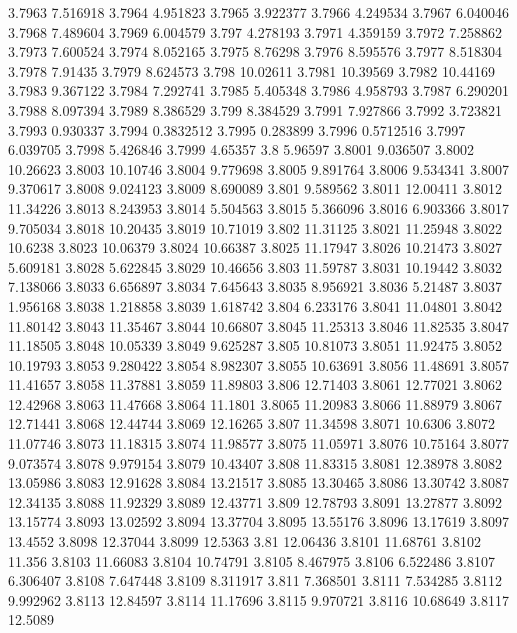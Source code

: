 3.7963  7.516918
3.7964  4.951823
3.7965  3.922377
3.7966  4.249534
3.7967  6.040046
3.7968  7.489604
3.7969  6.004579
3.797  4.278193
3.7971  4.359159
3.7972  7.258862
3.7973  7.600524
3.7974  8.052165
3.7975  8.76298
3.7976  8.595576
3.7977  8.518304
3.7978  7.91435
3.7979  8.624573
3.798  10.02611
3.7981  10.39569
3.7982  10.44169
3.7983  9.367122
3.7984  7.292741
3.7985  5.405348
3.7986  4.958793
3.7987  6.290201
3.7988  8.097394
3.7989  8.386529
3.799  8.384529
3.7991  7.927866
3.7992  3.723821
3.7993  0.930337
3.7994  0.3832512
3.7995  0.283899
3.7996  0.5712516
3.7997  6.039705
3.7998  5.426846
3.7999  4.65357
3.8  5.96597
3.8001  9.036507
3.8002  10.26623
3.8003  10.10746
3.8004  9.779698
3.8005  9.891764
3.8006  9.534341
3.8007  9.370617
3.8008  9.024123
3.8009  8.690089
3.801  9.589562
3.8011  12.00411
3.8012  11.34226
3.8013  8.243953
3.8014  5.504563
3.8015  5.366096
3.8016  6.903366
3.8017  9.705034
3.8018  10.20435
3.8019  10.71019
3.802  11.31125
3.8021  11.25948
3.8022  10.6238
3.8023  10.06379
3.8024  10.66387
3.8025  11.17947
3.8026  10.21473
3.8027  5.609181
3.8028  5.622845
3.8029  10.46656
3.803  11.59787
3.8031  10.19442
3.8032  7.138066
3.8033  6.656897
3.8034  7.645643
3.8035  8.956921
3.8036  5.21487
3.8037  1.956168
3.8038  1.218858
3.8039  1.618742
3.804  6.233176
3.8041  11.04801
3.8042  11.80142
3.8043  11.35467
3.8044  10.66807
3.8045  11.25313
3.8046  11.82535
3.8047  11.18505
3.8048  10.05339
3.8049  9.625287
3.805  10.81073
3.8051  11.92475
3.8052  10.19793
3.8053  9.280422
3.8054  8.982307
3.8055  10.63691
3.8056  11.48691
3.8057  11.41657
3.8058  11.37881
3.8059  11.89803
3.806  12.71403
3.8061  12.77021
3.8062  12.42968
3.8063  11.47668
3.8064  11.1801
3.8065  11.20983
3.8066  11.88979
3.8067  12.71441
3.8068  12.44744
3.8069  12.16265
3.807  11.34598
3.8071  10.6306
3.8072  11.07746
3.8073  11.18315
3.8074  11.98577
3.8075  11.05971
3.8076  10.75164
3.8077  9.073574
3.8078  9.979154
3.8079  10.43407
3.808  11.83315
3.8081  12.38978
3.8082  13.05986
3.8083  12.91628
3.8084  13.21517
3.8085  13.30465
3.8086  13.30742
3.8087  12.34135
3.8088  11.92329
3.8089  12.43771
3.809  12.78793
3.8091  13.27877
3.8092  13.15774
3.8093  13.02592
3.8094  13.37704
3.8095  13.55176
3.8096  13.17619
3.8097  13.4552
3.8098  12.37044
3.8099  12.5363
3.81  12.06436
3.8101  11.68761
3.8102  11.356
3.8103  11.66083
3.8104  10.74791
3.8105  8.467975
3.8106  6.522486
3.8107  6.306407
3.8108  7.647448
3.8109  8.311917
3.811  7.368501
3.8111  7.534285
3.8112  9.992962
3.8113  12.84597
3.8114  11.17696
3.8115  9.970721
3.8116  10.68649
3.8117  12.5089
